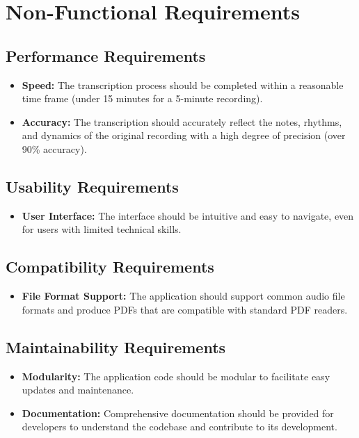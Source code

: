 \documentclass{article}
\begin{document}
\section{Non-Functional Requirements}

\subsection{Performance Requirements}
\begin{itemize}
    \item \textbf{Speed:} The transcription process should be completed within a reasonable time frame (under 15 minutes for a 5-minute recording).
    \item \textbf{Accuracy:} The transcription should accurately reflect the notes, rhythms, and dynamics of the original recording with a high degree of precision (over 90\% accuracy).
\end{itemize}

\subsection{Usability Requirements}
\begin{itemize}
    \item \textbf{User Interface:} The interface should be intuitive and easy to navigate, even for users with limited technical skills.
\end{itemize}

\subsection{Compatibility Requirements}
\begin{itemize}
    \item \textbf{File Format Support:} The application should support common audio file formats and produce PDFs that are compatible with standard PDF readers.
\end{itemize}

\subsection{Maintainability Requirements}
\begin{itemize}
    \item \textbf{Modularity:} The application code should be modular to facilitate easy updates and maintenance.
    \item \textbf{Documentation:} Comprehensive documentation should be provided for developers to understand the codebase and contribute to its development.
\end{itemize}
\end{document}
